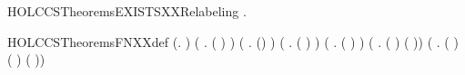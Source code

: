 \newcommand{\HOLCCSTheoremsEVERYXXDELETEXXELEMENT}{\UseVerbatim{HOLCCSTheoremsEVERYXXDELETEXXELEMENT}}
\begin{SaveVerbatim}{HOLCCSTheoremsEXISTSXXRelabeling}
\HOLTokenTurnstile{} \HOLSymConst{\HOLTokenExists{}}.  
\end{SaveVerbatim}
\newcommand{\HOLCCSTheoremsEXISTSXXRelabeling}{\UseVerbatim{HOLCCSTheoremsEXISTSXXRelabeling}}
\begin{SaveVerbatim}{HOLCCSTheoremsFNXXdef}
\HOLTokenTurnstile{} (\HOLSymConst{\HOLTokenForall{}}.    \HOLSymConst{=} \HOLTokenLeftbrace{}\HOLTokenRightbrace{}) \HOLSymConst{\HOLTokenConj{}}
   (\HOLSymConst{\HOLTokenForall{}}  .  ( )  \HOLSymConst{=}     ) \HOLSymConst{\HOLTokenConj{}}
   (\HOLSymConst{\HOLTokenForall{}} .  (\HOLConst{\ensuremath{\tau}})  \HOLSymConst{=}   ) \HOLSymConst{\HOLTokenConj{}}
   (\HOLSymConst{\HOLTokenForall{}}  .  ( \HOLSymConst{\ensuremath{+}} )  \HOLSymConst{=}    \HOLConst{\HOLTokenUnion{}}   ) \HOLSymConst{\HOLTokenConj{}}
   (\HOLSymConst{\HOLTokenForall{}}  .  ( \HOLSymConst{\ensuremath{\parallel}} )  \HOLSymConst{=}    \HOLConst{\HOLTokenUnion{}}   ) \HOLSymConst{\HOLTokenConj{}}
   (\HOLSymConst{\HOLTokenForall{}}  .  (\HOLConst{\ensuremath{\nu}}  )  \HOLSymConst{=}     ( \HOLConst{\HOLTokenUnion{}}   )) \HOLSymConst{\HOLTokenConj{}}
   (\HOLSymConst{\HOLTokenForall{}}  .
         (  )  \HOLSymConst{=}  ( ) (  )) \HOLSymConst{\HOLTokenConj{}}

\end{SaveVerbatim}
